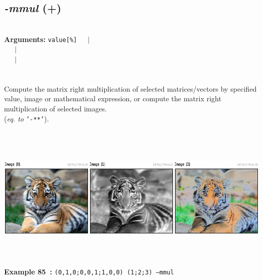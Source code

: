 \documentclass[a4paper,11pt,twoside]{book}
\begin{document}
\subsection{\emph{-mmul} (+)}\vspace*{-0.5em}
~\\\textbf{Arguments: } 
{\small \texttt{value[\%]}}~~~$|$\\
\hspace*{2.2cm}{\small \texttt{[image]}}~~~$|$\\
~~~$|$\\
\\~\\
Compute the matrix right multiplication of selected matrices/vectors by specified value, image or
mathematical expression, or compute the matrix right multiplication of selected images.
~\\(\emph{eq. to} {\small \texttt{'-**'}}).
\begin{center}\includegraphics[keepaspectratio=true,height=7cm,width=\textwidth]{img/gmic_def85.jpg}\\
{\footnotesize \textbf{Example 85~:} \texttt{(0,1,0;0,0,1;1,0,0) (1;2;3) --mmul}}
\end{center}
\end{document}
